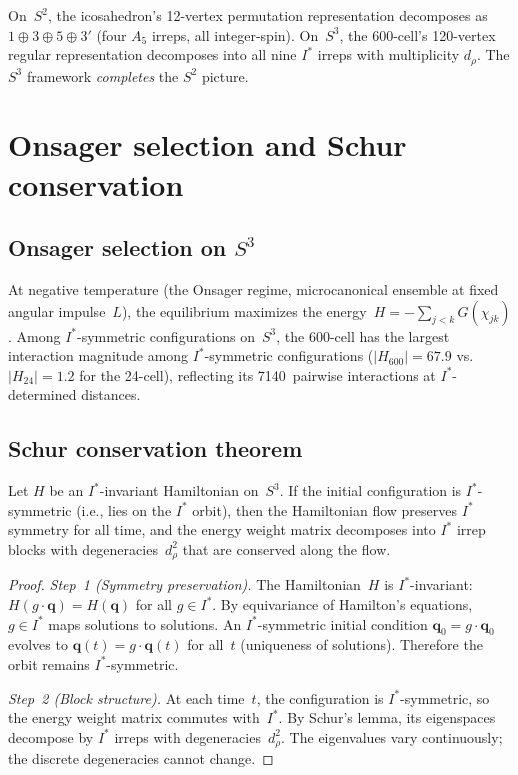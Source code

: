 \begin{remark}
On~$S^2$, the icosahedron's 12-vertex permutation representation
decomposes as $1 \oplus 3 \oplus 5 \oplus 3'$ (four $A_5$ irreps,
all integer-spin).  On~$S^3$, the 600-cell's 120-vertex regular
representation decomposes into all nine $I^*$ irreps with multiplicity
$d_\rho$.  The $S^3$ framework \emph{completes} the $S^2$ picture.
\end{remark}

\section{Onsager selection and Schur conservation}
\label{sec:onsager-schur}

\subsection{Onsager selection on $S^3$}

At negative temperature (the Onsager regime, microcanonical
ensemble at fixed angular impulse~$L$), the equilibrium maximizes
the energy~$H = -\sum_{j<k} G(\chi_{jk})$.  Among $I^*$-symmetric
configurations on~$S^3$, the 600-cell has the largest interaction magnitude
among $I^*$-symmetric configurations ($|H_{600}| = 67.9$ vs.\
$|H_{24}| = 1.2$ for the 24-cell), reflecting its 7140~pairwise
interactions at $I^*$-determined distances.

\subsection{Schur conservation theorem}

\begin{theorem}\label{thm:schur}
Let $H$ be an $I^*$-invariant Hamiltonian on~$S^3$.  If the initial
configuration is $I^*$-symmetric (i.e., lies on the $I^*$ orbit),
then the Hamiltonian flow preserves $I^*$ symmetry for all time,
and the energy weight matrix decomposes into $I^*$ irrep blocks
with degeneracies~$d_\rho^2$ that are conserved along the flow.
\end{theorem}

\begin{proof}
\emph{Step~1 (Symmetry preservation).}
The Hamiltonian~$H$ is $I^*$-invariant:
$H(g \cdot \mathbf{q}) = H(\mathbf{q})$ for all $g \in I^*$.
By equivariance of Hamilton's equations, $g \in I^*$ maps
solutions to solutions.  An $I^*$-symmetric initial condition
$\mathbf{q}_0 = g \cdot \mathbf{q}_0$ evolves to
$\mathbf{q}(t) = g \cdot \mathbf{q}(t)$ for all~$t$ (uniqueness
of solutions).  Therefore the orbit remains $I^*$-symmetric.

\emph{Step~2 (Block structure).}
At each time~$t$, the configuration is $I^*$-symmetric, so the
energy weight matrix commutes with~$I^*$.  By Schur's lemma, its
eigenspaces decompose by $I^*$ irreps with degeneracies~$d_\rho^2$.
The eigenvalues vary continuously; the discrete degeneracies
cannot change.
\end{proof}

